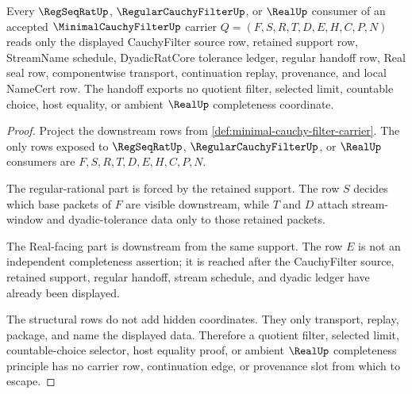 \begin{theorem}\label{thm:minimal-cauchy-filter-nonescape}
Every $\RegSeqRatUp$, $\RegularCauchyFilterUp$, or $\RealUp$ consumer of an accepted $\MinimalCauchyFilterUp$ carrier $Q=(F,S,R,T,D,E,H,C,P,N)$ reads only the displayed CauchyFilter source row, retained support row, StreamName schedule, DyadicRatCore tolerance ledger, regular handoff row, Real seal row, componentwise transport, continuation replay, provenance, and local NameCert row. The handoff exports no quotient filter, selected limit, countable choice, host equality, or ambient $\RealUp$ completeness coordinate.
\end{theorem}
\begin{proof}
Project the downstream rows from \autoref{def:minimal-cauchy-filter-carrier}. The only rows exposed to $\RegSeqRatUp$, $\RegularCauchyFilterUp$, or $\RealUp$ consumers are $F,S,R,T,D,E,H,C,P,N$.

The regular-rational part is forced by the retained support. The row $S$ decides which base packets of $F$ are visible downstream, while $T$ and $D$ attach stream-window and dyadic-tolerance data only to those retained packets.

The Real-facing part is downstream from the same support. The row $E$ is not an independent completeness assertion; it is reached after the CauchyFilter source, retained support, regular handoff, stream schedule, and dyadic ledger have already been displayed.

The structural rows do not add hidden coordinates. They only transport, replay, package, and name the displayed data. Therefore a quotient filter, selected limit, countable-choice selector, host equality proof, or ambient $\RealUp$ completeness principle has no carrier row, continuation edge, or provenance slot from which to escape.
\end{proof}



